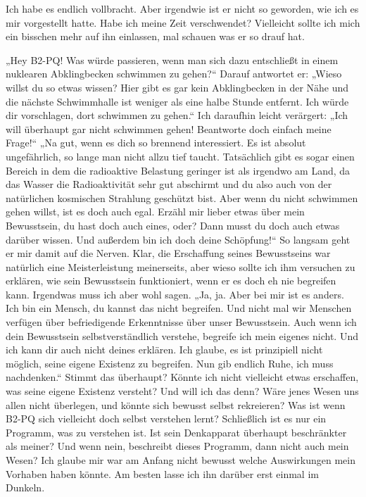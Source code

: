 Ich habe es endlich vollbracht. Aber irgendwie ist er nicht so geworden, wie ich es mir vorgestellt hatte. Habe ich meine Zeit verschwendet? Vielleicht sollte ich mich ein bisschen mehr auf ihn einlassen, mal schauen was er so drauf hat.

„Hey B2-PQ! Was würde passieren, wenn man sich dazu entschließt in einem nuklearen Abklingbecken schwimmen zu gehen?“ Darauf antwortet er: „Wieso willst du so etwas wissen? Hier gibt es gar kein Abklingbecken in der Nähe und die nächste Schwimmhalle ist weniger als eine halbe Stunde entfernt. Ich würde dir vorschlagen, dort schwimmen zu gehen.“ Ich daraufhin leicht verärgert: „Ich will überhaupt gar nicht schwimmen gehen! Beantworte doch einfach meine Frage!“ „Na gut, wenn es dich so brennend interessiert. Es ist absolut ungefährlich, so lange man nicht allzu tief taucht. Tatsächlich gibt es sogar einen Bereich in dem die radioaktive Belastung geringer ist als irgendwo am Land, da das Wasser die Radioaktivität sehr gut abschirmt und du also auch von der natürlichen kosmischen Strahlung geschützt bist. Aber wenn du nicht schwimmen gehen willst, ist es doch auch egal. Erzähl mir lieber etwas über mein Bewusstsein, du hast doch auch eines, oder? Dann musst du doch auch etwas darüber wissen. Und außerdem bin ich doch deine Schöpfung!“ So langsam geht er mir damit auf die Nerven. Klar, die Erschaffung seines Bewusstseins war natürlich eine Meisterleistung meinerseits, aber wieso sollte ich ihm versuchen zu erklären, wie sein Bewusstsein funktioniert, wenn er es doch eh nie begreifen kann. Irgendwas muss ich aber wohl sagen. „Ja, ja. Aber bei mir ist es anders. Ich bin ein Mensch, du kannst das nicht begreifen. Und nicht mal wir Menschen verfügen über befriedigende Erkenntnisse über unser Bewusstsein. Auch wenn ich dein Bewusstsein selbstverständlich verstehe, begreife ich mein eigenes nicht. Und ich kann dir auch nicht deines erklären. Ich glaube, es ist prinzipiell nicht möglich, seine eigene Existenz zu begreifen. Nun gib endlich Ruhe, ich muss nachdenken.“ Stimmt das überhaupt? Könnte ich nicht vielleicht etwas erschaffen, was seine eigene Existenz versteht? Und will ich das denn? Wäre jenes Wesen uns allen nicht überlegen, und könnte sich bewusst selbst rekreieren? Was ist wenn B2-PQ sich vielleicht doch selbst verstehen lernt? Schließlich ist es nur ein Programm, was zu verstehen ist. Ist sein Denkapparat überhaupt beschränkter als meiner? Und wenn nein, beschreibt dieses Programm, dann nicht auch mein Wesen? Ich glaube mir war am Anfang nicht bewusst welche Auswirkungen mein Vorhaben haben könnte. Am besten lasse ich ihn darüber erst einmal im Dunkeln.